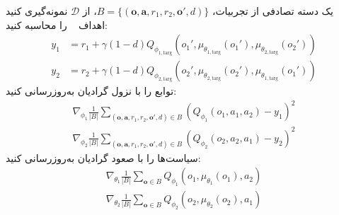 \begin{algorithm}[H]
\begin{algorithmic}[1]
                    \State یک دسته تصادفی از تجربیات، $B = \{(\boldsymbol{o}, \boldsymbol{a}, r_1, r_2, \boldsymbol{o}', d)\}$، از $\mathcal{D}$ نمونه‌گیری کنید
                    اهداف
                    \Statex \hspace{\algorithmicindent} \hspace{\algorithmicindent} ~
                     را محاسبه کنید:
                     \vspace{-15pt}
                    \begin{align*}
                        y_1 &= r_1 + \gamma (1-d) Q_{\phi_{1,\text{targ}}}(o_1', \mu_{\theta_{1,\text{targ}}}(o_1'), \mu_{\theta_{2,\text{targ}}}(o_2')) \\
                        y_2 &= r_2 + \gamma (1-d) Q_{\phi_{2,\text{targ}}}(o_2', \mu_{\theta_{2,\text{targ}}}(o_2'), \mu_{\theta_{1,\text{targ}}}(o_1'))
                    \end{align*}
                    \vspace{-35pt}
                    \State%
                    توابع  را با نزول گرادیان به‌روزرسانی کنید:
                    \vspace{-15pt}
                    \begin{align*}
                        \nabla_{\phi_1} \frac{1}{|B|}\sum_{(\boldsymbol{o}, \boldsymbol{a}, r_1, r_2, \boldsymbol{o}', d) \in B} \left( Q_{\phi_1}(o_1, a_1, a_2) - y_1 \right)^2 \\
                        \nabla_{\phi_2} \frac{1}{|B|}\sum_{(\boldsymbol{o}, \boldsymbol{a}, r_1, r_2, \boldsymbol{o}', d) \in B} \left( Q_{\phi_2}(o_2, a_2, a_1) - y_2 \right)^2
                    \end{align*}
                    \vspace{-30pt}
                    \State %
                    سیاست‌ها را با صعود گرادیان به‌روزرسانی کنید:
                    \vspace{-15pt}
                    \begin{align*}
                        \nabla_{\theta_1} \frac{1}{|B|}\sum_{\boldsymbol{o} \in B}Q_{\phi_1}(o_1, \mu_{\theta_1}(o_1), a_2) \\
                        \nabla_{\theta_2} \frac{1}{|B|}\sum_{\boldsymbol{o} \in B}Q_{\phi_2}(o_2, \mu_{\theta_2}(o_2), a_1)

\end{align*}
\end{algorithmic}
\end{algorithm}
